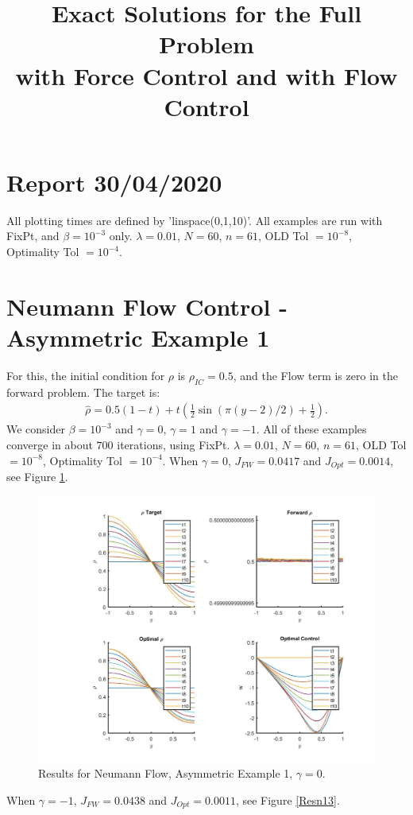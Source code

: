\documentclass[11pt, a4paper]{article}
\title{Exact Solutions for the Full Problem \\with Force Control and with Flow Control}
\date{}
\theoremstyle{definition}
\begin{document}
	
\section*{Report 30/04/2020}
All plotting times are defined by 'linspace(0,1,10)'. All examples are run with FixPt, and $\beta = 10^{-3}$ only. $\lambda = 0.01$, $N= 60$, $n = 61$, OLD Tol $= 10^{-8}$, Optimality Tol $=10^{-4}$.

\section{Neumann Flow Control - Asymmetric Example 1}
For this, the initial condition for $\rho$ is $\rho_{IC}=0.5$, and the Flow term is zero in the forward problem.
The target is:
\begin{align*}
\hat \rho = 0.5(1-t) + t(\frac{1}{2}\sin(\pi(y - 2)/2) + \frac{1}{2}).
\end{align*}
We consider $\beta = 10^{-3}$ and $\gamma = 0$, $\gamma = 1$ and $\gamma = -1$. All of these examples converge in about $700$ iterations, using FixPt. $\lambda = 0.01$, $N= 60$, $n = 61$, OLD Tol $= 10^{-8}$, Optimality Tol $=10^{-4}$.
When $\gamma = 0$, $J_{FW} = 0.0417$ and $J_{Opt} = 0.0014$, see Figure \ref{Res03}.
\begin{figure}[h]
	\includegraphics[scale=0.3]{Res03.jpg}
	\caption{Results for Neumann Flow, Asymmetric Example 1, $\gamma = 0$.}
	\label{Res03}
\end{figure}
When $\gamma = -1$, $J_{FW} = 0.0438$ and $J_{Opt} = 0.0011$, see Figure \ref{Resn13}.
\end{document}
